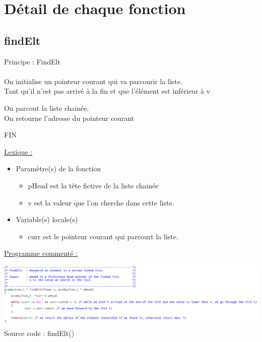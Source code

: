 \documentclass[a4paper]{article}
\newcommand\tab[1][1cm]{\hspace*{#1}}
\begin{document}
\section{Détail de chaque fonction}
\subsection{findElt}
\begin{algorithm}
Principe : FindElt
\\
\\
\tab On initialise un pointeur courant qui va parcourir la liste. 
\\
\tab Tant qu'il n'est pas arrivé à la fin et que l'élément est inférieur à v 

\tab \tab On parcout la liste chainée.
\\
\tab On retourne l'adresse du pointeur courant 

FIN
\end{algorithm}
\underline{Lexique :}
\begin{itemize}
\item Paramètre(s) de la fonction  
\begin{itemize}
\item pHead est la tête fictive de la liste chainée
\item v est la valeur que l'on cherche dans cette liste.
\end{itemize}
\item Variable(s) locale(s)
\begin{itemize}
\item curr est le pointeur courant qui parcourt la liste.
\end{itemize}
\end{itemize}
\underline{Programme commenté :}
\begin{center}
\includegraphics[scale=0.39]{findElt.png}
Source code : findElt()
\end{center}
\end{document}
